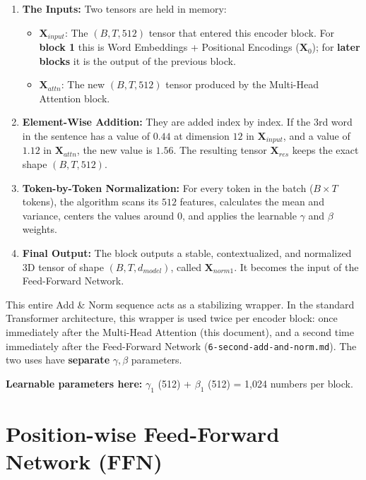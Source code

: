 \documentclass[11pt,a4paper,oneside]{report}
\providecommand{\tightlist}{\setlength{\itemsep}{0pt}\setlength{\parskip}{0pt}}
\begin{document}
\begin{enumerate}
\def\labelenumi{\arabic{enumi}.}
\item
  \textbf{The Inputs:} Two tensors are held in memory:

  \begin{itemize}
  \tightlist
  \item
    \(\mathbf{X}_{input}\): The \((B, T, 512)\) tensor that entered this encoder block. For \textbf{block 1} this is Word Embeddings + Positional Encodings (\(\mathbf{X}_0\)); for \textbf{later blocks} it is the output of the previous block.
  \item
    \(\mathbf{X}_{attn}\): The new \((B, T, 512)\) tensor produced by the Multi-Head Attention block.
  \end{itemize}
\item
  \textbf{Element-Wise Addition:} They are added index by index. If the 3rd word in the sentence has a value of \(0.44\) at dimension \(12\) in \(\mathbf{X}_{input}\), and a value of \(1.12\) in \(\mathbf{X}_{attn}\), the new value is \(1.56\). The resulting tensor \(\mathbf{X}_{res}\) keeps the exact shape \((B, T, 512)\).
\item
  \textbf{Token-by-Token Normalization:} For every token in the batch (\(B \times T\) tokens), the algorithm scans its \(512\) features, calculates the mean and variance, centers the values around \(0\), and applies the learnable \(\gamma\) and \(\beta\) weights.
\item
  \textbf{Final Output:} The block outputs a stable, contextualized, and normalized 3D tensor of shape \textbf{\((B, T, d_{model})\)}, called \(\mathbf{X}_{norm1}\). It becomes the input of the Feed-Forward Network.
\end{enumerate}

This entire Add \& Norm sequence acts as a stabilizing wrapper. In the standard Transformer architecture, this wrapper is used twice per encoder block: once immediately after the Multi-Head Attention (this document), and a second time immediately after the Feed-Forward Network (\texttt{6-second-add-and-norm.\allowbreak{}md}). The two uses have \textbf{separate} \(\gamma, \beta\) parameters.

\textbf{Learnable parameters here:} \(\gamma_1\) (512) + \(\beta_1\) (512) = 1,024 numbers per block.




\chapter{Position-wise Feed-Forward Network (FFN)}\label{position-wise-feed-forward-network-ffn}
\end{document}
